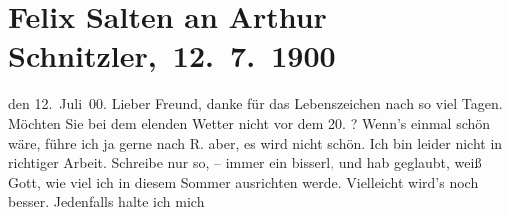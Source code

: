 

         
         \renewcommand{\erwaehntePersonen}{Personen: Felix Salten, Paul Schlenther}
         \renewcommand{\erwaehnteInstitutionen}{Institutionen: Burgtheater}
         \renewcommand{\erwaehnteOrte}{Orte: Bad Ischl, Kochgasse, Reichenau an der Rax, Wien}
         \renewcommand{\erwaehnteWerke}{Werke: Der Schleier der Beatrice. Schauspiel in fünf Akten}
               \section[ Felix Salten an Arthur Schnitzler, 12. 7. 1900]{ Felix Salten an Arthur Schnitzler, 12. 7. 1900}\nopagebreak{}\rehead{ }\begin{ledgroupsized}[t]{13cm}\normalsize\beginnumbering{} \toendnotes[C]{\smallbreak\pagebreak[2]} 
\toendnotes[C]{\smallbreak}\pstart
           \raggedleft{}{\pb}den 12. Juli 00.\pend
           \pstart
           Lieber Freund, danke für das Lebenszeichen nach so viel Tagen.
               Möchten Sie bei dem elenden Wetter nicht vor dem 20.{ }\label{K_L03306-1v}\label{K_L03306-1h}? Wenn’s einmal
               schön wäre, führe ich ja gerne nach 
               R.
                 aber, es wird nicht schön. Ich
               bin leider nicht in richtiger Arbeit. Schreibe nur so, – immer ein
                  bisserl\textcolor{gray}{,} und hab geglaubt, weiß Gott, wie viel ich in diesem
               Sommer ausrichten werde. Vielleicht wird's noch besser. Jedenfalls halte ich mich

\end{ledgroupsized}
